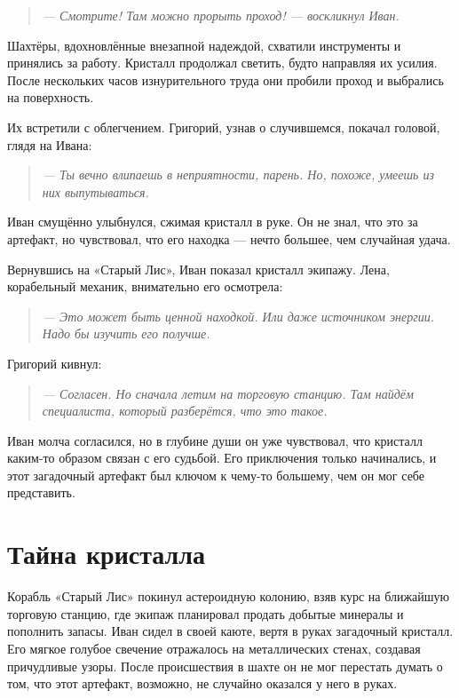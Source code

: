 \documentclass[12pt,a4paper]{book} %
\newenvironment{dialogue}{\begin{quote}\itshape}{\end{quote}}
\begin{document}
\begin{dialogue}
--- Смотрите! Там можно прорыть проход! --- воскликнул Иван.
\end{dialogue}

Шахтёры, вдохновлённые внезапной надеждой, схватили инструменты и принялись за работу. Кристалл продолжал светить, будто направляя их усилия. После нескольких часов изнурительного труда они пробили проход и выбрались на поверхность.

Их встретили с облегчением. Григорий, узнав о случившемся, покачал головой, глядя на Ивана:

\begin{dialogue}
--- Ты вечно влипаешь в неприятности, парень. Но, похоже, умеешь из них выпутываться.
\end{dialogue}

Иван смущённо улыбнулся, сжимая кристалл в руке. Он не знал, что это за артефакт, но чувствовал, что его находка --- нечто большее, чем случайная удача.

Вернувшись на «Старый Лис», Иван показал кристалл экипажу. Лена, корабельный механик, внимательно его осмотрела:

\begin{dialogue}
--- Это может быть ценной находкой. Или даже источником энергии. Надо бы изучить его получше.
\end{dialogue}

Григорий кивнул:

\begin{dialogue}
--- Согласен. Но сначала летим на торговую станцию. Там найдём специалиста, который разберётся, что это такое.
\end{dialogue}

Иван молча согласился, но в глубине души он уже чувствовал, что кристалл каким-то образом связан с его судьбой. Его приключения только начинались, и этот загадочный артефакт был ключом к чему-то большему, чем он мог себе представить.

\chapter{Тайна кристалла}

Корабль «Старый Лис» покинул астероидную колонию, взяв курс на ближайшую торговую станцию, где экипаж планировал продать добытые минералы и пополнить запасы. Иван сидел в своей каюте, вертя в руках загадочный кристалл. Его мягкое голубое свечение отражалось на металлических стенах, создавая причудливые узоры. После происшествия в шахте он не мог перестать думать о том, что этот артефакт, возможно, не случайно оказался у него в руках.
\end{document}
